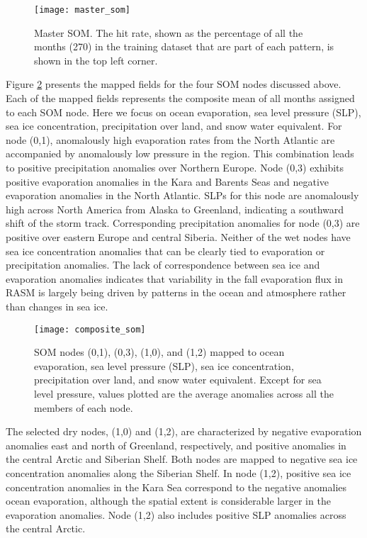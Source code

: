 \begin{figure}
  \centering
  \texttt{[image: master\_som]}
  \caption{Master SOM. The hit rate, shown as the percentage of all the months (270) in the training dataset that are part of each pattern, is shown in the top left corner.}
  \label{fig:master_som}
\end{figure}

Figure \ref{fig:composite_som} presents the mapped fields for the four SOM nodes discussed above.
Each of the mapped fields represents the composite mean of all months assigned to each SOM node.
Here we focus on ocean evaporation, sea level pressure (SLP), sea ice concentration, precipitation over land, and snow water equivalent.
For node (0,1), anomalously high evaporation rates from the North Atlantic are accompanied by anomalously low pressure in the region.
This combination leads to positive precipitation anomalies over Northern Europe.
Node (0,3) exhibits positive evaporation anomalies in the Kara and Barents Seas and negative evaporation anomalies in the North Atlantic.
SLPs for this node are anomalously high across North America from Alaska to Greenland, indicating a southward shift of the storm track.
Corresponding precipitation anomalies for node (0,3) are positive over eastern Europe and central Siberia.
Neither of the wet nodes have sea ice concentration anomalies that can be clearly tied to evaporation or precipitation anomalies.
The lack of correspondence between sea ice and evaporation anomalies indicates that variability in the fall evaporation flux in RASM is largely being driven by patterns in the ocean and atmosphere rather than changes in sea ice.

\begin{figure}
  \centering
  \texttt{[image: composite\_som]}
  \caption{SOM nodes (0,1), (0,3), (1,0), and (1,2) mapped to ocean evaporation, sea level pressure (SLP), sea ice concentration, precipitation over land, and snow water equivalent. Except for sea level pressure, values plotted are the average anomalies across all the members of each node.}
  \label{fig:composite_som}
\end{figure}

The selected dry nodes, (1,0) and (1,2), are characterized by negative evaporation anomalies east and north of Greenland, respectively, and positive anomalies in the central Arctic and Siberian Shelf.
Both nodes are mapped to negative sea ice concentration anomalies along the Siberian Shelf.
In node (1,2), positive sea ice concentration anomalies in the Kara Sea correspond to the negative anomalies ocean evaporation, although the spatial extent is considerable larger in the evaporation anomalies.
Node (1,2) also includes positive SLP anomalies across the central Arctic.

